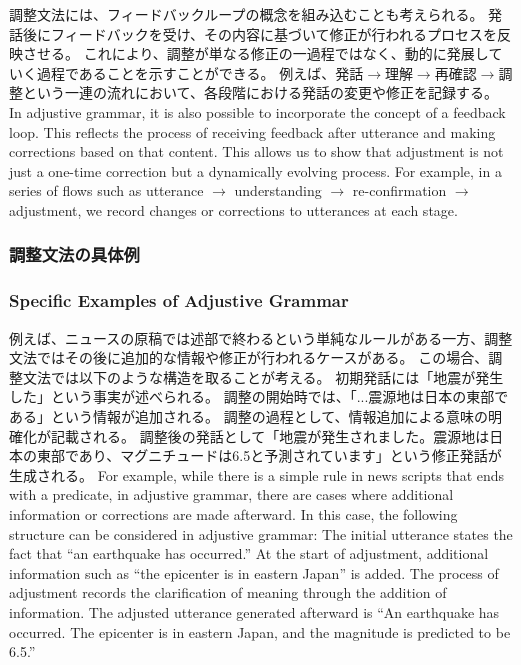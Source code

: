 \documentclass[a4paper]{article}
\begin{document}
\ifJPN
調整文法には、フィードバックループの概念を組み込むことも考えられる。
発話後にフィードバックを受け、その内容に基づいて修正が行われるプロセスを反映させる。
これにより、調整が単なる修正の一過程ではなく、動的に発展していく過程であることを示すことができる。
例えば、発話$\rightarrow$理解$\rightarrow$再確認$\rightarrow$調整という一連の流れにおいて、各段階における発話の変更や修正を記録する。
\else
In adjustive grammar, it is also possible to incorporate the concept of a feedback loop.
This reflects the process of receiving feedback after utterance and making corrections based on that content.
This allows us to show that adjustment is not just a one-time correction but a dynamically evolving process.
For example, in a series of flows such as utterance $\rightarrow$ understanding $\rightarrow$ re-confirmation $\rightarrow$ adjustment, we record changes or corrections to utterances at each stage.
\fi

\ifJPN
\subsubsection{調整文法の具体例}
\else
\subsubsection{Specific Examples of Adjustive Grammar}
\fi

\ifJPN
例えば、ニュースの原稿では述部で終わるという単純なルールがある一方、調整文法ではその後に追加的な情報や修正が行われるケースがある。
この場合、調整文法では以下のような構造を取ることが考える。
初期発話には「地震が発生した」という事実が述べられる。
調整の開始時では、「...震源地は日本の東部である」という情報が追加される。
調整の過程として、情報追加による意味の明確化が記載される。
調整後の発話として「地震が発生されました。震源地は日本の東部であり、マグニチュードは6.5と予測されています」という修正発話が生成される。
\else
For example, while there is a simple rule in news scripts that ends with a predicate, in adjustive grammar, there are cases where additional information or corrections are made afterward.
In this case, the following structure can be considered in adjustive grammar:
The initial utterance states the fact that ``an earthquake has occurred.''
At the start of adjustment, additional information such as ``the epicenter is in eastern Japan'' is added.
The process of adjustment records the clarification of meaning through the addition of information.
The adjusted utterance generated afterward is ``An earthquake has occurred. The epicenter is in eastern Japan, and the magnitude is predicted to be 6.5.''
\fi
\end{document}
